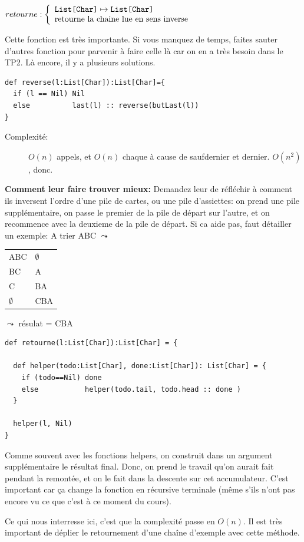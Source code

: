 \documentclass[10pt]{article}\usepackage[correction,nu]{esial}
\begin{document}
\begin{Question}
  $retourne: \left\{
    \begin{array}{l}
      \text{\texttt{List[Char]}}\mapsto \text{\texttt{List[Char]}}\\
      \text{retourne la chaine lue en sens inverse}
    \end{array}\right.$  
\end{Question}
\begin{Reponse}
  Cette fonction est très importante. Si vous manquez de temps, faites sauter
  d'autres fonction pour parvenir à faire celle là car on en a très besoin dans
  le TP2. Là encore, il y a plusieurs solutions.
  \begin{Verbatim}[label=version bourinne]
def reverse(l:List[Char]):List[Char]={
  if (l == Nil) Nil
  else          last(l) :: reverse(butLast(l))
}
  \end{Verbatim}
  \begin{description}
  \item[Complexité:] $O(n)$ appels, et $O(n)$ chaque à cause de saufdernier et
    dernier. $O(n^2)$, donc.
  \end{description}
  
  \textbf{Comment leur faire trouver mieux:} Demandez leur de réfléchir à
  comment ils inversent l'ordre d'une pile de cartes, ou une pile d'assiettes: on prend une pile 
  supplémentaire, on passe le premier de la pile de départ sur l'autre, et on
  recommence avec la deuxieme de la pile de départ. Si ca aide pas, faut
  détailler un exemple:
  A trier ABC $\leadsto$ \begin{tabular}{|l l|}\hline
    ABC&$\emptyset$\\
    BC&A\\
    C&BA\\
    $\emptyset$&CBA\\\hline
  \end{tabular}$\leadsto$ résulat = CBA

  \begin{Verbatim}[label=avec helper]
def retourne(l:List[Char]):List[Char] = {

  def helper(todo:List[Char], done:List[Char]): List[Char] = {
    if (todo==Nil) done
    else           helper(todo.tail, todo.head :: done )
  }

  helper(l, Nil)
}
  \end{Verbatim}
  Comme souvent avec les fonctions helpers, on construit dans un argument
  supplémentaire le résultat final. Donc, on prend le travail qu'on aurait fait
  pendant la remontée, et on le fait dans la descente sur cet
  accumulateur. C'est important car ça change la fonction en récursive
  terminale (même s'ils n'ont pas encore vu ce que c'est à ce moment du cours).

  Ce qui nous interresse ici, c'est que la complexité passe en $O(n)$. Il est
  très important de déplier le retournement d'une chaîne d'exemple avec cette
  méthode. 

\end{Reponse}
\end{document}
